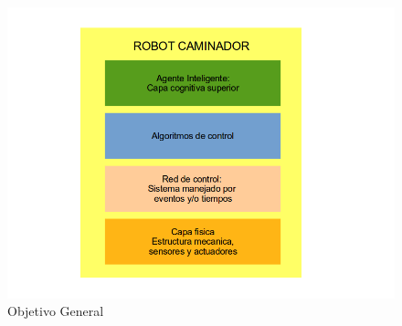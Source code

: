 \begin{figure}[!htb]
  \centering
  \includegraphics[scale=0.5]{../images/objGen.png}
  \caption{Objetivo General}
  \label{fig:objGen}
\end{figure}

